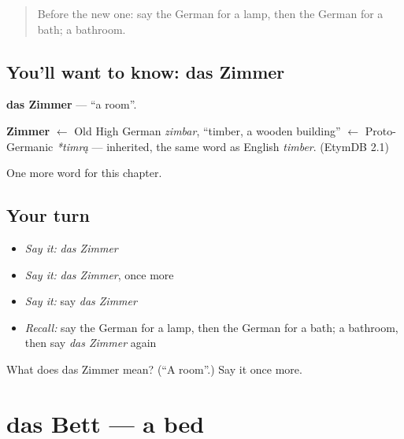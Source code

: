 \label{lesson:GE-C77-zimmer}



\begin{quote}
Before the new one: say the German for a lamp, then the German for a bath; a bathroom.
\end{quote}

\subsection*{You'll want to know: das Zimmer}
\textbf{das Zimmer} — \textquotedblleft{}a room\textquotedblright{}.

\begin{cousinweb}
\textbf{Zimmer} $\leftarrow$ Old High German \emph{zimbar}, \textquotedblleft{}timber, a wooden building\textquotedblright{} $\leftarrow$ Proto-Germanic \emph{*timrą} — inherited, the same word as English \emph{timber}. (EtymDB 2.1)
\end{cousinweb}

\begin{grammarlens}[title={What you've built}]
One more word for this chapter.
\end{grammarlens}

\subsection*{Your turn}
\begin{itemize}
\raggedright
  \item \emph{Say it:} \emph{das Zimmer}
  \item \emph{Say it:} \emph{das Zimmer}, once more
  \item \emph{Say it:} say \emph{das Zimmer}
  \item \emph{Recall:} say the German for a lamp, then the German for a bath; a bathroom, then say \emph{das Zimmer} again
\end{itemize}

\begin{tcolorbox}[breakable,colback=teal!4,colframe=teal!35!black,title={Before you move on}]
What does das Zimmer mean? (\textquotedblleft{}A room\textquotedblright{}.) Say it once more.
\end{tcolorbox}
\section[das Bett]{das Bett — a bed}

\label{lesson:GE-C77-bett}



